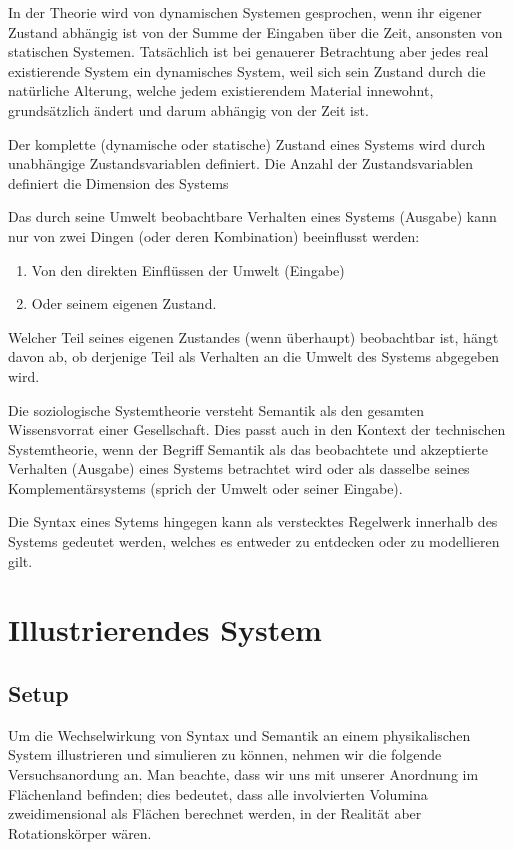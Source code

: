 \documentclass[11pt]{scrreprt} %
\theoremstyle{definition}
\begin{document}
In der Theorie wird von dynamischen Systemen gesprochen, wenn ihr eigener Zustand abhängig ist von der Summe der Eingaben über die Zeit, ansonsten von statischen Systemen. Tatsächlich ist bei genauerer Betrachtung aber jedes real existierende System ein dynamisches System, weil sich sein Zustand durch die natürliche Alterung, welche jedem existierendem Material innewohnt, grundsätzlich ändert und darum abhängig von der Zeit ist.

Der komplette (dynamische oder statische) Zustand eines Systems wird durch unabhängige Zustandsvariablen definiert. Die Anzahl der Zustandsvariablen definiert die Dimension des Systems

Das durch seine Umwelt beobachtbare Verhalten eines Systems (Ausgabe) kann nur von zwei Dingen (oder deren Kombination) beeinflusst werden:
\begin{enumerate}
\item Von den direkten Einflüssen der Umwelt (Eingabe)
\item Oder seinem eigenen Zustand.
\end{enumerate}

Welcher Teil seines eigenen Zustandes (wenn überhaupt) beobachtbar ist, hängt davon ab, ob derjenige Teil als Verhalten an die Umwelt des Systems abgegeben wird.

Die soziologische Systemtheorie \cite{wiki:semantik} versteht Semantik als den gesamten Wissensvorrat einer Gesellschaft. Dies passt auch in den Kontext der technischen Systemtheorie, wenn der Begriff Semantik als das beobachtete und akzeptierte Verhalten (Ausgabe) eines Systems betrachtet wird oder als dasselbe seines Komplementärsystems (sprich der Umwelt oder seiner Eingabe).

Die Syntax eines Sytems hingegen kann als verstecktes Regelwerk innerhalb des Systems gedeutet werden, welches es entweder zu entdecken oder zu modellieren gilt. 

\chapter{Illustrierendes System}

\section{Setup}

Um die Wechselwirkung von Syntax und Semantik an einem physikalischen System illustrieren und simulieren zu können, nehmen wir die folgende Versuchsanordung an. Man beachte, dass wir uns mit unserer Anordnung im Flächenland befinden; dies bedeutet, dass  alle involvierten Volumina zweidimensional als Flächen berechnet werden, in der Realität aber Rotationskörper wären.
\end{document}
